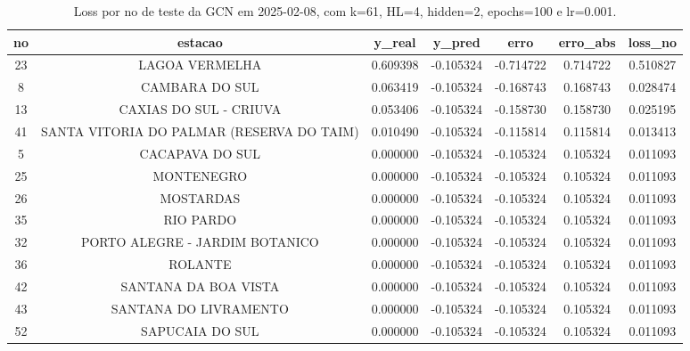 \begin{table}[h]
\centering
\caption{Loss por no de teste da GCN em 2025-02-08, com k=61, HL=4, hidden=2, epochs=100 e lr=0.001.}
\label{tab:gcn_loss_k61_hl4_h2_e100_d20250208}
\begin{tabular}{ccccccc}
\toprule
no & estacao & y\_real & y\_pred & erro & erro\_abs & loss\_no \\
\midrule
23 & LAGOA VERMELHA & 0.609398 & -0.105324 & -0.714722 & 0.714722 & 0.510827 \\
8 & CAMBARA DO SUL & 0.063419 & -0.105324 & -0.168743 & 0.168743 & 0.028474 \\
13 & CAXIAS DO SUL - CRIUVA & 0.053406 & -0.105324 & -0.158730 & 0.158730 & 0.025195 \\
41 & SANTA VITORIA DO PALMAR (RESERVA DO TAIM) & 0.010490 & -0.105324 & -0.115814 & 0.115814 & 0.013413 \\
5 & CACAPAVA DO SUL & 0.000000 & -0.105324 & -0.105324 & 0.105324 & 0.011093 \\
25 & MONTENEGRO & 0.000000 & -0.105324 & -0.105324 & 0.105324 & 0.011093 \\
26 & MOSTARDAS & 0.000000 & -0.105324 & -0.105324 & 0.105324 & 0.011093 \\
35 & RIO PARDO & 0.000000 & -0.105324 & -0.105324 & 0.105324 & 0.011093 \\
32 & PORTO ALEGRE - JARDIM BOTANICO & 0.000000 & -0.105324 & -0.105324 & 0.105324 & 0.011093 \\
36 & ROLANTE & 0.000000 & -0.105324 & -0.105324 & 0.105324 & 0.011093 \\
42 & SANTANA DA BOA VISTA & 0.000000 & -0.105324 & -0.105324 & 0.105324 & 0.011093 \\
43 & SANTANA DO LIVRAMENTO & 0.000000 & -0.105324 & -0.105324 & 0.105324 & 0.011093 \\
52 & SAPUCAIA DO SUL & 0.000000 & -0.105324 & -0.105324 & 0.105324 & 0.011093 \\
\bottomrule
\end{tabular}
\end{table}
